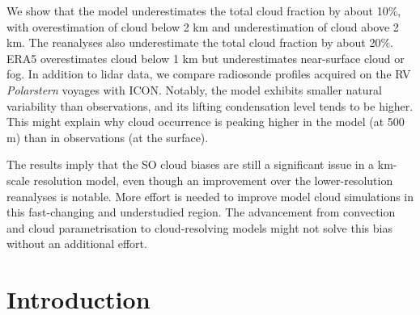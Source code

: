 \documentclass[12pt,a4paper]{article}
\begin{document}
We show that the model underestimates the total cloud fraction by about 10\%,
with overestimation of cloud below 2 km and underestimation of cloud above 2
km. The reanalyses also underestimate the total cloud fraction by about 20\%.
ERA5 overestimates cloud below 1 km but underestimates near-surface cloud or
fog. In addition to lidar data, we compare radiosonde profiles acquired on the
RV \textit{Polarstern} voyages with ICON. Notably, the model exhibits smaller
natural variability than observations, and its lifting condensation level tends
to be higher. This might explain why cloud occurrence is peaking higher in the
model (at 500 m) than in observations (at the surface).

The results imply that the SO cloud biases are still a significant issue in a
km-scale resolution model, even though an improvement over the lower-resolution
reanalyses is notable. More effort is needed to improve model cloud simulations
in this fast-changing and understudied region. The advancement from convection
and cloud parametrisation to cloud-resolving models might not solve this bias
without an additional effort.

\section{Introduction}
\end{document}
